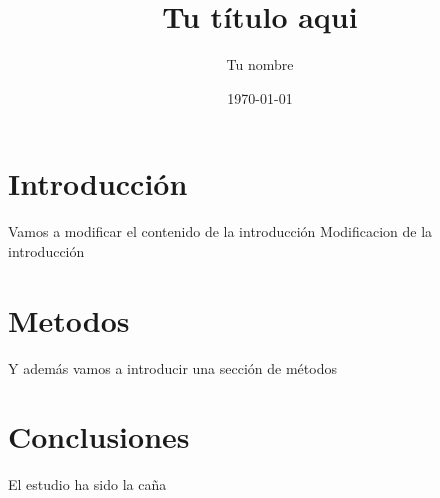 \documentclass{article}
\title{Tu título aqui}
\author{Tu nombre}
\date{\today}
\begin{document}
\maketitle

\section{Introducción}

Vamos a modificar el contenido de la introducción
Modificacion de la introducción
\section {Metodos}

Y además vamos a introducir una sección de métodos

\section{Conclusiones}

El estudio ha sido la caña
\end{document}
